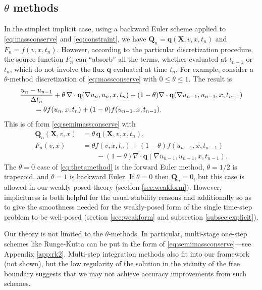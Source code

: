\documentclass[final,leqno,onefignum,onetabnum]{siamltex1213bueler}
\newcommand\bq{\mathbf{q}}
\newcommand\bQ{\mathbf{Q}}
\newcommand\bX{\mathbf{X}}
\newcommand{\Div}{\nabla\cdot}
\renewcommand{\grad}{\nabla}
\begin{document}
\subsection{$\theta$ methods}  \label{subsec:thetamethods}  In the simplest implicit case, using a backward Euler scheme applied to \eqref{eq:massconserve} and \eqref{eq:constraint}, we have $\bQ_n = \bq(\bX,v,x,t_n)$ and $F_n = f(v,x,t_n)$.  However, according to the particular discretization procedure, the source function $F_n$ can ``absorb'' all the terms, whether evaluated at $t_{n-1}$ or $t_n$, which do not involve the flux $\bq$ evaluated at time $t_n$.  For example, consider a $\theta$-method discretization \cite{MortonMayers2005} of \eqref{eq:massconserve} with $0\le \theta \le 1$.  The result is
\begin{align}
  &\frac{u_n - u_{n-1}}{\Delta t_n} + \theta\, \Div \bq(\grad u_n,u_n,x,t_n) + (1-\theta) \Div \bq(\grad u_{n-1},u_{n-1},x,t_{n-1}) \label{eq:thetamethod} \\
  &\qquad =  \theta f(u_n,x,t_n) + (1-\theta) f(u_{n-1},x,t_{n-1}). \notag
\end{align}
This is of form \eqref{eq:semimassconserve} with
\begin{align*}
\bQ_n(\bX,v,x) &= \theta\, \bq(\bX,v,x,t_n), \\
F_n(v,x)       &= \theta f(v,x,t_n) + (1-\theta) f(u_{n-1},x,t_{n-1}) \\
               &\qquad - (1-\theta) \Div \bq(\grad u_{n-1},u_{n-1},x,t_{n-1}).
\end{align*}
The $\theta=0$ case of \eqref{eq:thetamethod} is the forward Euler method, $\theta=1/2$ is trapezoid, and $\theta=1$ is backward Euler.  If $\theta=0$ then $\bQ_n=0$, but this case is allowed in our weakly-posed theory (section \ref{sec:weakform}).  However, implicitness is both helpful for the usual stability reasons \cite{MortonMayers2005} and additionally so as to give the smoothness needed for the weakly-posed form of the single time-step problem to be well-posed (section \ref{sec:weakform} and subsection \ref{subsec:explicit}).

Our theory is not limited to the $\theta$-methods.  In particular, multi-stage one-step schemes like Runge-Kutta can be put in the form of \eqref{eq:semimassconserve}---see Appendix \ref{app:rk2}.  Multi-step integration methods also fit into our framework (not shown), but the low regularity of the solution in the vicinity of the free boundary suggests that we may not achieve accuracy improvements from such schemes.
\end{document}
